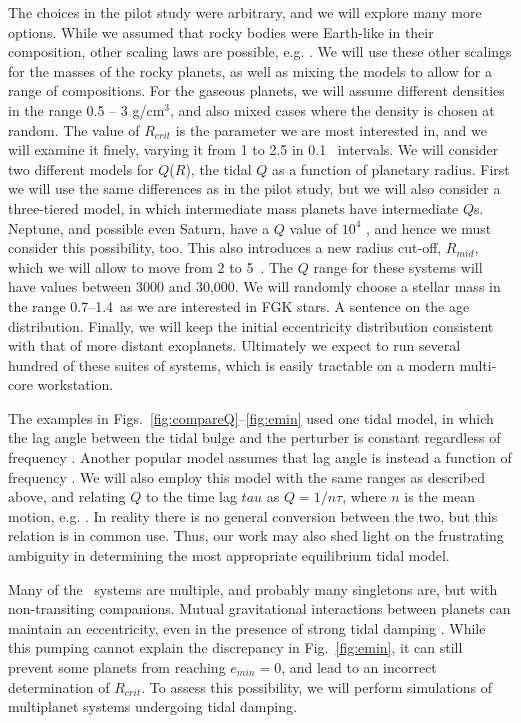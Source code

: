 The choices in the pilot study were arbitrary, and we will explore
many more options. While we assumed that rocky bodies were Earth-like
in their composition, other scaling laws are possible, e.g.
\cite{Seager07,Fortney07,Lissauer10}. We will use these other scalings
for the masses of the rocky planets, as well as mixing the models to
allow for a range of compositions. For the gaseous planets, we will
assume different densities in the range 0.5 -- 3 g/cm$^3$, and also
mixed cases where the density is chosen at random. The value of
$R_{crit}$ is the parameter we are most interested in, and we will
examine it finely, varying it from 1 to 2.5 \rearth in 0.1~\reath
intervals. We will consider two different models for $Q$($R$), the
tidal $Q$ as a function of planetary radius. First we will use the
same differences as in the pilot study, but we will also consider a
three-tiered model, in which intermediate mass planets have
intermediate $Q$s. Neptune, and possible even Saturn, have a $Q$ value
of $10^4$ \citep{Hamliton04,Makarov12}, and hence we must consider
this possibility, too. This also introduces a new radius cut-off,
$R_{mid}$, which we will allow to move from 2 to 5~\rearth. The $Q$
range for these systems will have values between 3000 and 30,000. We
will randomly choose a stellar mass in the range 0.7--1.4~\msun as we
are interested in FGK stars. A sentence on the age
distribution. Finally, we will keep the initial eccentricity
distribution consistent with that of more distant
exoplanets. Ultimately we expect to run several hundred of these
suites of systems, which is easily tractable on a modern multi-core
workstation.

The examples in Figs.~\ref{fig:compareQ}--\ref{fig:emin} used one
tidal model, in which the lag angle between the tidal bulge and the
perturber is constant regardless of frequency
\citep[e.g.][]{GoldreichSoter66,Jackson08}. Another popular model
assumes that lag angle is instead a function of frequency
\citep[e.g.][]{Hut81,Matsumura10}. We will also employ this model with
the same ranges as described above, and relating $Q$ to the time lag
$tau$ as $Q = 1/n\tau$, where $n$ is the mean motion, e.g.
\cite{Correia12}. In reality there is no general conversion between
the two, but this relation is in common use. Thus, our work may also
shed light on the frustrating ambiguity in determining the most
appropriate equilibrium tidal model.

\medskip
{\centerline{}}
\smallskip


Many of the \kepler~systems are multiple, and probably many singletons
are, but with non-transiting companions. Mutual gravitational
interactions between planets can maintain an eccentricity, even in the
presence of strong tidal damping
\citep{AdamsLaughlin05,Correia12,vanLaerhovenGreenberg13}. While this
pumping cannot explain the discrepancy in Fig.~\ref{fig:emin}, it can
still prevent some planets from reaching $e_{min} = 0$, and lead to an
incorrect determination of $R_{crit}$. To assess this possibility, we
will perform simulations of multiplanet systems undergoing tidal
damping.

